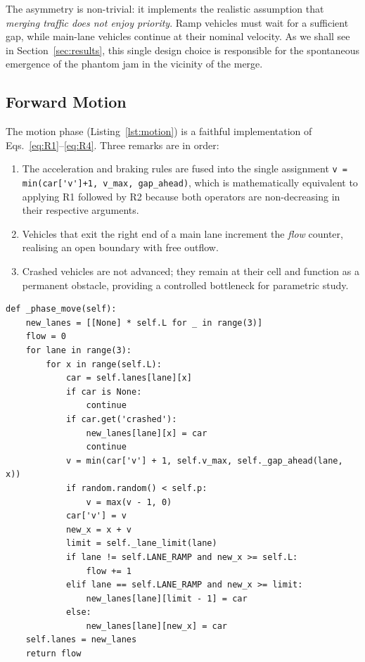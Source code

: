 \documentclass[11pt,a4paper]{article}
\begin{document}
The asymmetry is non-trivial: it implements the realistic assumption that
\emph{merging traffic does not enjoy priority}. Ramp vehicles must wait
for a sufficient gap, while main-lane vehicles continue at their nominal
velocity. As we shall see in Section~\ref{sec:results}, this single design
choice is responsible for the spontaneous emergence of the
phantom jam in the vicinity of the merge.

\subsection{Forward Motion}

The motion phase (Listing~\ref{lst:motion}) is a faithful implementation
of Eqs.~\eqref{eq:R1}--\eqref{eq:R4}. Three remarks are in order:
\begin{enumerate}[leftmargin=1.6em]
\item The acceleration and braking rules are fused into the single
      assignment \verb|v = min(car['v']+1, v_max, gap_ahead)|, which is
      mathematically equivalent to applying R1 followed by R2 because
      both operators are non-decreasing in their respective arguments.
\item Vehicles that exit the right end of a main lane increment the
      \emph{flow} counter, realising an open boundary with free outflow.
\item Crashed vehicles are not advanced; they remain at their cell and
      function as a permanent obstacle, providing a controlled
      bottleneck for parametric study.
\end{enumerate}

\begin{lstlisting}[caption={NaSch motion phase.},label={lst:motion}]
def _phase_move(self):
    new_lanes = [[None] * self.L for _ in range(3)]
    flow = 0
    for lane in range(3):
        for x in range(self.L):
            car = self.lanes[lane][x]
            if car is None:
                continue
            if car.get('crashed'):
                new_lanes[lane][x] = car
                continue
            v = min(car['v'] + 1, self.v_max, self._gap_ahead(lane, x))
            if random.random() < self.p:
                v = max(v - 1, 0)
            car['v'] = v
            new_x = x + v
            limit = self._lane_limit(lane)
            if lane != self.LANE_RAMP and new_x >= self.L:
                flow += 1
            elif lane == self.LANE_RAMP and new_x >= limit:
                new_lanes[lane][limit - 1] = car
            else:
                new_lanes[lane][new_x] = car
    self.lanes = new_lanes
    return flow
\end{lstlisting}
\end{document}
